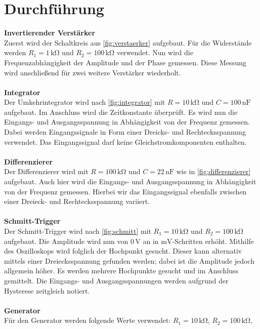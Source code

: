 \section{Durchführung}
\label{sec:Durchführung}

\textbf{Invertierender Verstärker}\\
Zuerst wird der Schaltkreis aus \autoref{fig:verstaerker} aufgebaut. Für die Widerstände werden
$R_1 = 1 \,\unit{\kilo\ohm}$ und $R_2 = 100 \,\unit{\kilo\ohm}$ verwendet. Nun wird die Frequenzabhängigkeit der
Amplitude und der Phase gemessen. Diese Messung wird anschließend für zwei weitere Verstärker wiederholt. \\
\\
\textbf{Integrator}\\
Der Umkehrintegrator wird nach \autoref{fig:integrator} mit $R = 10\,\unit{\kilo\ohm}$ und 
$C = 100\,\text{nF}$ aufgebaut. Im Anschluss wird die Zeitkonstante überprüft. 
Es wird nun die Eingangs- und Ausgangsspannung in Abhängigkeit von der Frequenz gemessen. 
Dabei werden Eingangssignale in Form einer Dreicks- und Rechtecksspannung verwendet. Das Eingangssignal 
darf keine Gleichstromkomponenten enthalten.\\
\\
\textbf{Differenzierer}\\
Der Differenzierer wird mit $R=100\,\unit{\kilo\ohm}$ und $C=22\,\text{nF}$ wie in \autoref{fig:differenzierer} aufgebaut.
Auch hier wird die Eingangs- und Ausgangsspannung in Abhängigkeit von der Frequenz gemessen. Hierbei wir das Eingangssignal 
ebenfalls zwischen einer Dreieck- und Rechtecksspannung variiert.\\
\\
\textbf{Schmitt-Trigger}\\
Der Schmitt-Trigger wird nach \autoref{fig:schmitt} mit $R_1 = 10\,\unit{\kilo\ohm}$ und
$R_2=100\,\unit{\kilo\ohm}$ aufgebaut. Die Amplitude wird nun von $0\,\unit{\volt}$ an in $\unit{\milli\volt}$-Schritten 
erhöht. Mithilfe des Oszilloskops wird folglich der Hochpunkt gesucht. Dieser kann alternativ mittels einer 
Dreiecksspannung gefunden werden; dabei ist die Amplitude jedoch allgemein höher. Es werden mehrere Hochpunkte gesucht und im Anschluss gemittelt. 
Die Eingangs- und Ausgangsspannungen werden aufgrund der Hysterese zeitgleich notiert. \\
\\
\textbf{Generator}\\
Für den Generator werden folgende Werte verwendet: $R_1= 10\,\unit{\kilo\ohm}$, $R_2=100\,\unit{\kilo\ohm}$,
